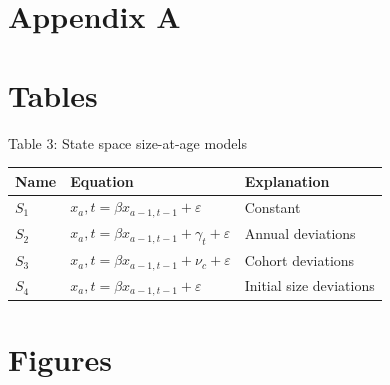 \documentclass[
]{article}
\begin{document}
\pagebreak

\hypertarget{appendix-a}{%
\section*{Appendix A}\label{appendix-a}}

\hypertarget{tables}{%
\section{Tables}\label{tables}}

Table 3: State space size-at-age models

\begin{longtable}[]{@{}lll@{}}
\toprule
Name & Equation & Explanation \\
\midrule
\endhead
\(S_1\) & \(x_a,t = \beta x_{a-1,t-1} + \varepsilon\) & Constant \\
\(S_2\) & \(x_a,t = \beta x_{a-1,t-1} + \gamma_t + \varepsilon\) &
Annual deviations \\
\(S_3\) & \(x_a,t = \beta x_{a-1,t-1} + \nu_c + \varepsilon\) & Cohort
deviations \\
\(S_4\) & \(x_a,t = \beta x_{a-1,t-1} + \varepsilon\) & Initial size
deviations \\
\bottomrule
\end{longtable}

\hypertarget{figures}{%
\section{Figures}\label{figures}}
\end{document}
